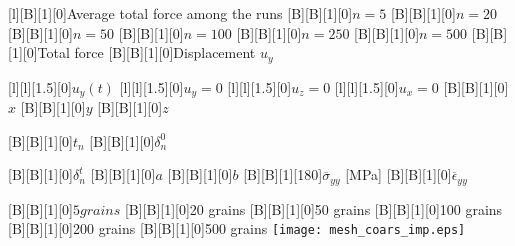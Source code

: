 \documentclass[border=12pt, crop]{standalone}
\begin{document}
  
  
      [l][B][1][0]{Average total force among the runs}
      [B][B][1][0]{$n = 5$}
      [B][B][1][0]{$n = 20$}
      [B][B][1][0]{$n = 50$}
      [B][B][1][0]{$n = 100$}
      [B][B][1][0]{$n = 250$}
      [B][B][1][0]{$n = 500$}
      [B][B][1][0]{Total force}
      [B][B][1][0]{Displacement $u_y$}
            
      [l][l][1.5][0]{$u_y(t)$}
      [l][l][1.5][0]{$u_y = 0$}
      [l][l][1.5][0]{$u_z = 0$}
      [l][l][1.5][0]{$u_x = 0$}
 [B][B][1][0]{$x$}
  [B][B][1][0]{$y$}  
  [B][B][1][0]{$z$}
  
    [B][B][1][0]{$t_n$}
        [B][B][1][0]{$\delta_n^0$}

    [B][B][1][0]{$\delta_n^t$}
    [B][B][1][0]{$a$}
    [B][B][1][0]{$b$}
     [B][B][1][180]{$\overline{\sigma}_{yy}$ [MPa]}
   [B][B][1][0]{$\overline{\epsilon}_{yy}$}

   [B][B][1][0]{$5 grains$}
 [B][B][1][0]{20 grains}
  [B][B][1][0]{50 grains}
   [B][B][1][0]{100 grains}
    [B][B][1][0]{200 grains}
    [B][B][1][0]{500 grains}
      \texttt{[image: mesh\_coars\_imp.eps]}
    
\end{document}
